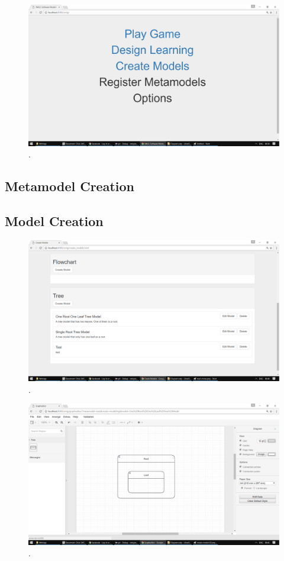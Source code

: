 \documentclass[12pt, a4paper]{report} \usepackage[titletoc]{appendix}
\begin{document}
\begin{appendices}
\begin{figure}[ht] \centering \includegraphics[width=12cm]{main-menu}
\caption{.}
\label{main-menu}
\end{figure}

\subsection{Metamodel Creation}



\subsection{Model Creation}

\begin{figure}[ht] \centering \includegraphics[width=12cm]{create-model-01}
\caption{.}
\label{create-model-01}
\end{figure}

\begin{figure}[ht] \centering \includegraphics[width=12cm]{create-model-02}
\caption{.}
\label{create-model-02}
\end{figure}


\end{appendices}
\end{document}
